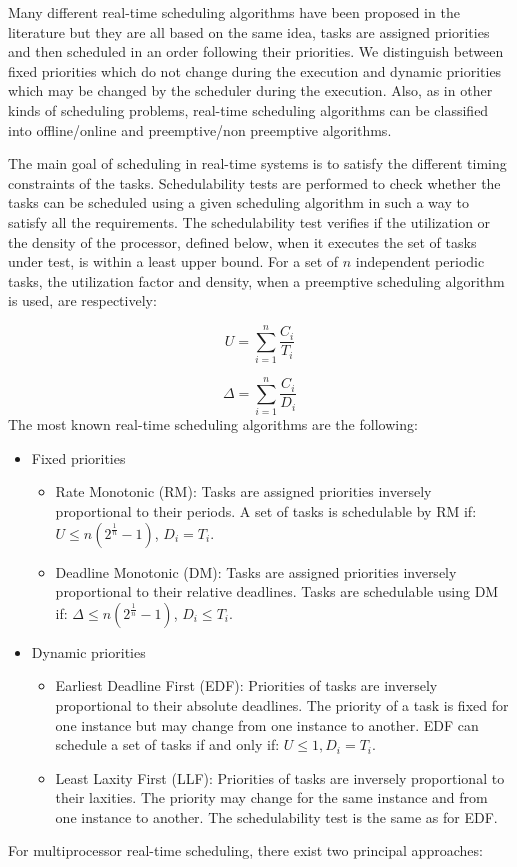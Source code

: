 Many different real-time scheduling algorithms have been proposed in the literature but they are all based on the same idea, tasks are assigned priorities and then scheduled in an order following their priorities. We distinguish between fixed priorities which do not change during the execution and dynamic priorities which may be changed by the scheduler during the execution. Also, as in other kinds of scheduling problems, real-time scheduling algorithms can be classified into offline/online and preemptive/non preemptive algorithms.

The main goal of scheduling in real-time systems is to satisfy the different timing constraints of the tasks. Schedulability tests are performed to check whether the tasks can be scheduled using a given scheduling algorithm in such a way to satisfy all the requirements. The schedulability test verifies if the utilization or the density of the processor, defined below, when it executes the set of tasks under test, is within a least upper bound. For a set of $n$ independent periodic tasks, the utilization factor and density, when a preemptive scheduling algorithm is used, are respectively:

\begin{equation}
U = \sum_{i=1}^{n}\frac{C_i}{T_i}
\end{equation}

\begin{equation}
\Delta = \sum_{i=1}^{n}\frac{C_i}{D_i}
\end{equation}
The most known real-time scheduling algorithms are the following:

\begin{itemize}
\item Fixed priorities
\begin{itemize}
\item Rate Monotonic (RM): Tasks are assigned priorities inversely proportional to their periods. A set of tasks is schedulable by RM if: $U \leq n(2^{\frac{1}{n}}-1)$, $D_i = T_i$. 
\item Deadline Monotonic (DM): Tasks are assigned priorities inversely proportional to their relative deadlines. Tasks are schedulable using DM if: $\Delta \leq n(2^{\frac{1}{n}}-1)$, $D_i \leq T_i$. 
\end{itemize}
\item Dynamic priorities
\begin{itemize}
\item Earliest Deadline First (EDF): Priorities of tasks are inversely proportional to their absolute deadlines. The priority of a task is fixed for one instance but may change from one instance to another. EDF can schedule a set of tasks if and only if: $U \leq 1, D_i = T_i$.
\item Least Laxity First (LLF): Priorities of tasks are inversely proportional to their laxities. The priority may change for the same instance and from one instance to another. The schedulability test is the same as for EDF.
\end{itemize}
\end{itemize}
 For multiprocessor real-time scheduling, there exist two principal approaches:

